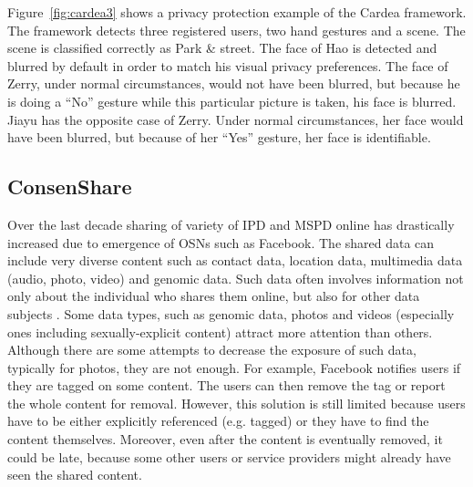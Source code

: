 \documentclass[conference, 11pt]{IEEEtran}
\begin{document}
Figure~\ref{fig:cardea3} shows a privacy protection example of the Cardea framework. The framework detects three registered users, two hand gestures and a scene. The scene is classified correctly as Park \& street. The face of Hao is detected and blurred by default in order to match his visual privacy preferences. The face of Zerry, under normal circumstances, would not have been blurred, but because he is doing a “No” gesture while this particular picture is taken, his face is blurred. Jiayu has the opposite case of Zerry. Under normal circumstances, her face would have been blurred, but because of her “Yes” gesture, her face is identifiable.


\subsection{ConsenShare}\label{ConsenShare}
Over the last decade sharing of variety of \ac{IPD} and \ac{MSPD} online has drastically increased due to emergence of \ac{OSN}s such as Facebook. The shared data can include very diverse content such as contact data, location data, multimedia data (audio, photo, video) and genomic data. Such data often involves information not only about the individual who shares them online, but also for other data subjects \cite{ahern2007}. Some data types, such as genomic data, photos and videos (especially ones including sexually-explicit content) attract more attention than others. Although there are some attempts to decrease the exposure of such data, typically for photos, they are not enough. For example, Facebook notifies users if they are tagged on some content. The users can then remove the tag or report the whole content for removal. However, this solution is still limited because users have to be either explicitly referenced (e.g. tagged) or they have to find the content themselves. Moreover, even after the content is eventually removed, it could be late, because some other users or service providers might already have seen the shared content. 
\end{document}
